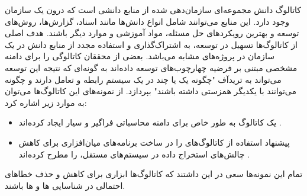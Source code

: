 کاتالوگ دانش مجموعه‌ای سازمان‌دهی شده از منابع دانشی است که درون یک سازمان وجود
دارد. این منابع می‌توانند شامل انواع دانش‌ها مانند اسناد، گزارش‌ها، روش‌های
توسعه و بهترین رویکرد‌های حل مسئله، مواد آموزشی و موارد دیگر باشند. هدف اصلی از
کاتالوگ‌ها تسهیل در توسعه، به اشتراک‌گذاری و استفاده مجدد از منابع دانش در یک
سازمان در پروژه‌های مشابه می‌باشد. بعضی از محققان کاتالوگی را برای دامنه مشخصی
مبتنی بر فرضیه چهارچوب‌های  توسعه داده‌اند به گونه‌ای که نتیجه این توسعه
می‌تواند به تریدآف "چگونه یک یا چند  در یک سیستم رابطه و تعامل دارند و
چگونه می‌توانند با یکدیگر همزستی داشته باشند" بپردازد. از نمونه‌های این
کاتالوگ‌ها می‌توان به موارد زیر اشاره کرد:

\begin{itemize}
    \item {} یک کاتالوگ به طور خاص برای دامنه محاسباتی
    فراگیر و سیار ایجاد کرده‌اند \cite{serrano2013ubiquitous}.
    \item {} پیشنهاد استفاده از کاتالوگ‌های  را در
    ساخت برنامه‌های میان‌افزاری  برای کاهش چالش‌های استخراج داده
     در سیستم‌های مستقل، را مطرح کرده‌اند \cite{torres2014nfr}.
\end{itemize}

تمام این نمونه‌ها سعی در این داشتند که کاتالوگ‌ها ابزاری برای کاهش و حذف خطا‌های
احتمالی در شناسایی ها و ها باشند.